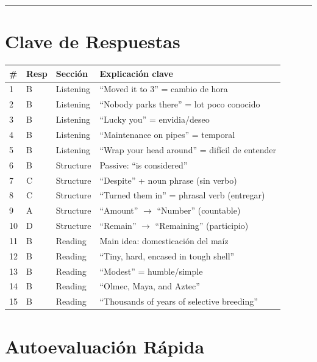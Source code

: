 \documentclass[10pt,a4paper]{article}
\begin{document}
\vspace{8pt}
\rule{\textwidth}{0.8pt}

\section*{Clave de Respuestas}

\begin{center}
\begin{tabular}{llll}
\toprule
\textbf{\#} & \textbf{Resp} & \textbf{Secci\'on} & \textbf{Explicaci\'on clave} \\
\midrule
1  & B & Listening  & ``Moved it to 3'' = cambio de hora \\
2  & B & Listening  & ``Nobody parks there'' = lot poco conocido \\
3  & B & Listening  & ``Lucky you'' = envidia/deseo \\
4  & B & Listening  & ``Maintenance on pipes'' = temporal \\
5  & B & Listening  & ``Wrap your head around'' = dif\'icil de entender \\
6  & B & Structure  & Passive: ``is considered'' \\
7  & C & Structure  & ``Despite'' + noun phrase (sin verbo) \\
8  & C & Structure  & ``Turned them in'' = phrasal verb (entregar) \\
9  & A & Structure  & ``Amount'' $\to$ ``Number'' (countable) \\
10 & D & Structure  & ``Remain'' $\to$ ``Remaining'' (participio) \\
11 & B & Reading    & Main idea: domesticaci\'on del ma\'iz \\
12 & B & Reading    & ``Tiny, hard, encased in tough shell'' \\
13 & B & Reading    & ``Modest'' = humble/simple \\
14 & B & Reading    & ``Olmec, Maya, and Aztec'' \\
15 & B & Reading    & ``Thousands of years of selective breeding'' \\
\bottomrule
\end{tabular}
\end{center}

\vspace{6pt}

\section*{Autoevaluaci\'on R\'apida}
\end{document}
